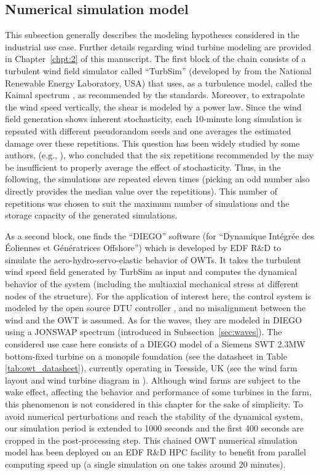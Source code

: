 \subsection{Numerical simulation model}
This subsection generally describes the modeling hypotheses considered in the industrial use case. 
Further details regarding wind turbine modeling are provided in Chapter~\ref{chpt:2} of this manuscript. 
The first block of the chain consists of a turbulent wind field simulator called ``TurbSim'' (developed by \citealp{turbsim_2009} from the National Renewable Energy Laboratory, USA) that uses, as a turbulence model, called the Kaimal spectrum \citep{kaimal_1972}, as recommended by the \citet{iec_2019} standards. 
Moreover, to extrapolate the wind speed vertically, the shear is modeled by a power law. 
Since the wind field generation shows inherent stochasticity, each 10-minute long simulation is repeated with different pseudorandom seeds and one averages the estimated damage over these repetitions. 
This question has been widely studied by some authors, (e.g., \citealp{slot_sorensen_2020}), who concluded that the six repetitions recommended by the \citet{iec_2019} may be insufficient to properly average the effect of stochasticity. 
Thus, in the following, the simulations are repeated eleven times (picking an odd number also directly provides the median value over the repetitions). 
This number of repetitions was chosen to suit the maximum number of simulations and the storage capacity of the generated simulations.

As a second block, one finds the ``DIEGO'' software (for ``Dynamique Int\'{e}gr\'{e}e des Éoliennes et G\'{e}n\'{e}ratrices Offshore''\footnotemark) which is developed by EDF R\&D \citep{kim_natarajan_2022} to simulate the aero-hydro-servo-elastic behavior of OWTs. 
It takes the turbulent wind speed field generated by TurbSim as input and computes the dynamical behavior of the system (including the multiaxial mechanical stress at different nodes of the structure). 
For the application of interest here, the control system is modeled by the open source DTU controller \citep{dtu_controler_2013}, and no misalignment between the wind and the OWT is assumed. 
As for the waves, they are modeled in DIEGO using a JONSWAP spectrum (introduced in Subsection~\ref{sec:waves}). 
The considered use case here consists of a DIEGO model of a Siemens SWT 2.3MW bottom-fixed turbine on a monopile foundation (see the datasheet in Table \ref{tab:owt_datasheet}), currently operating in Teesside, UK (see the wind farm layout and wind turbine diagram in ). 
Although wind farms are subject to the wake effect, affecting the behavior and performance of some turbines in the farm, this phenomenon is not considered in this chapter for the sake of simplicity. 
To avoid numerical perturbations and reach the stability of the dynamical system, our simulation period is extended to 1000 seconds and the first 400 seconds are cropped in the post-processing step. 
This chained OWT numerical simulation model has been deployed on an EDF R\&D HPC facility to benefit from parallel computing speed up (a single simulation on one  takes around 20 minutes).

